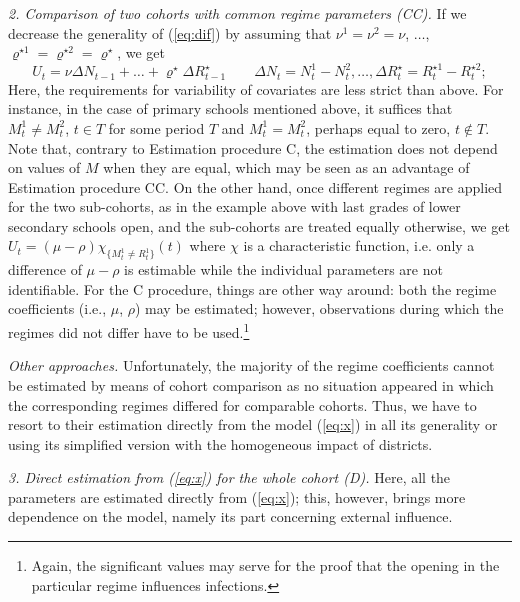 \documentclass[fleqn,10pt]{wlscirep}
\begin{document}
{\em 2. Comparison of two cohorts with common regime parameters (CC).} If we decrease the generality of (\ref{eq:dif}) by assuming that $\nu^1 = \nu^2 = \nu$, $\dots$, $\varrho^{\star 1} = \varrho^{\star 2} = \varrho^{\star}$, we get
$$
U_t = \nu \Delta N_{t-1} + \dots + \varrho^\star \Delta R^\star_{t-1}  
\qquad \Delta N_{t}= N^1_{t}-N^2_{t},\dots,
\Delta R^\star_t = R^{\star 1}_{t}-R^{\star 2}_{t};
$$
Here, the requirements for variability of covariates are less strict than above. For instance, in the case of primary schools mentioned above, it suffices that $M^1_t \neq M^2_t$, $t\in T$ for some period $T$ and $M^1_t = M^2_t$, perhaps equal to zero, $t\notin T$. Note that, contrary to Estimation procedure C, the estimation does not depend on values of $M$ when they are equal, which may be seen as an advantage of Estimation procedure CC. On the other hand, once different regimes are applied for the two sub-cohorts, as in the example above with last grades of lower secondary schools open, and the sub-cohorts are treated equally otherwise, we get $U_t=(\mu - \rho) \chi_{\{M^1_t \neq R^1_t\}}(t)$ where $\chi$ is a characteristic function, i.e. only a difference of $\mu - \rho$ is estimable while the individual parameters are not identifiable. For the C procedure, things are other way around: both the regime coefficients (i.e., $\mu$, $\rho$) may be estimated; however, observations during which the regimes did not differ have to be used.\footnote{Again, the significant values may serve for the proof that the opening in the particular regime influences infections.}


\textit{Other approaches.} Unfortunately, the majority of the regime coefficients cannot be estimated by means of cohort comparison as no situation appeared in which the corresponding regimes differed for comparable cohorts. Thus, we have to resort to their estimation directly from the model (\ref{eq:x}) in all its generality or using its simplified version with the homogeneous impact of districts.

{\em 3. Direct estimation from (\ref{eq:x}) for the whole cohort (D).} Here, all the parameters are estimated directly from (\ref{eq:x}); this, however, brings more dependence on the model, namely its part concerning external influence.
\end{document}
